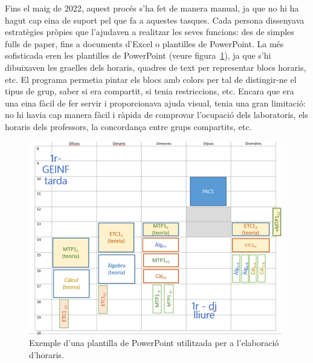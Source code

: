 \documentclass[a4paper,12pt]{ThesisStyle}
\begin{document}
Fins el maig de 2022, aquest procés s'ha fet de manera manual, ja que no hi ha hagut cap eina de suport pel que fa a aquestes tasques. Cada persona dissenyava estratègies pròpies que l'ajudaven a realitzar les seves funcions: des de simples fulls de paper, fins a documents d'Excel o plantilles de PowerPoint. La més sofisticada eren les plantilles de PowerPoint (veure figura~\ref{img:plantilla_power}), ja que s'hi dibuixaven les graelles dels horaris, quadres de text per representar blocs horaris, etc. El programa permetia pintar els blocs amb colors per tal de distingir-ne el tipus de grup, saber si era compartit, si tenia restriccions, etc. Encara que era una eina fàcil de fer servir i proporcionava ajuda visual, tenia una gran limitació: no hi havia cap manera fàcil i ràpida de comprovar l'ocupació dels laboratoris, els horaris dels professors, la concordança entre grups compartits, etc.

\newpage

\begin{figure}[H]
  \centering
  \includegraphics[width=\textwidth]{assets/figs/powerHoraris.png}
  \caption{\label{img:plantilla_power}Exemple d'una plantilla de PowerPoint utilitzada per a l'elaboració d'horaris.}
\end{figure}
\end{document}
